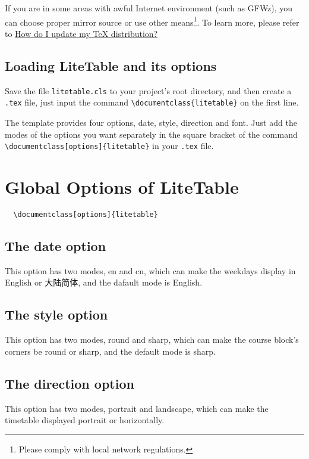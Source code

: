 \documentclass[11pt]{article}
\def\pkg#1{\texorpdfstring{\textcolor{pkgcolor}{\textsf{#1}}}{“#1”}}
\def\mode#1{\texorpdfstring{\textcolor{moducolor}{\textsf{#1}}}{“#1”}}
\begin{document}
If you are in some areas with awful Internet environment (such as GFWz), you can choose proper mirror source or use other means\footnote{Please comply with local network regulations.}. To learn more, please refer to \href{https://tex.stackexchange.com/questions/55437/how-do-i-update-my-tex-distribution}{How do I update my \TeX{} distribution?}

\subsection{Loading \pkg{LiteTable} and its options}
Save the file \verb|litetable.cls| to your project's root directory, and then create a \verb|.tex| file, just input the command \verb|\documentclass{litetable}| on the first line.

The template provides four options, \mode{date}, \mode{style}, \mode{direction} and \mode{font}. Just add the modes of the options you want separately in the square bracket of the command \verb|\documentclass[options]{litetable}| in your \verb|.tex| file.

\newpage
\section{Global Options of \pkg{LiteTable}}
\begin{verbatim}
  \documentclass[options]{litetable}
\end{verbatim}
\subsection{The \mode{date} option}
This option has two modes, \mode{en} and \mode{cn}, which can make the weekdays display in English or 大陆简体, and the dafault mode is English.

\subsection{The \mode{style} option}
This option has two modes, \mode{round} and \mode{sharp}, which can make the course block's corners be round or sharp, and the default mode is sharp.

\subsection{The \mode{direction} option}
This option has two modes, \mode{portrait} and \mode{landscape}, which can make the timetable displayed portrait or horizontally.
\end{document}
